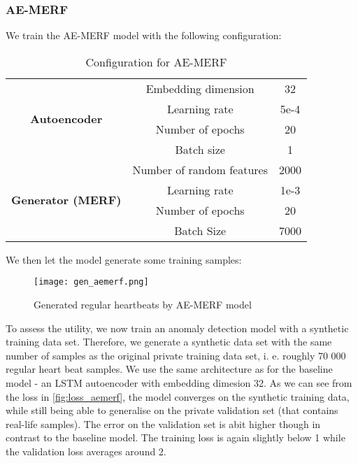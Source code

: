 \subsubsection*{AE-MERF}
We train the AE-MERF model with the following configuration:
\begin{table}[H]
    \centering
    \begin{tabular}{|c|c|c|}
        \hline
        \multirow{4}{*}{\textbf{Autoencoder}}& Embedding dimension & 32 \\ 
                                    & Learning rate & 5e-4 \\
                                    & Number of epochs& 20\\
                                    & Batch size & 1\\
        \hline
        \multirow{4}{*}{\textbf{Generator (MERF)}} & Number of random features & 2000 \\
                                        & Learning rate & 1e-3\\
                                        & Number of epochs & 20\\
                                        & Batch Size & 7000 \\
        \hline
    \end{tabular}
    \caption{Configuration for AE-MERF}
\end{table}
We then let the model generate some training samples: 

\begin{figure}[h]
    \centering
    \texttt{[image: gen\_aemerf.png]}
    \caption{Generated regular heartbeats by AE-MERF model}
\end{figure}

To assess the utility, we now train an anomaly detection model with a synthetic training data set. Therefore, we generate a synthetic data set with the same number of samples as the original private training data set, i. e. roughly 70 000 regular heart beat samples. We use the same architecture as for the baseline model - an LSTM autoencoder with embedding dimesion 32. As we can see from the loss in \cref{fig:loss_aemerf}, the model converges on the synthetic training data, while still being able to generalise on the private validation set (that contains real-life samples). The error on the validation set is abit higher though in contrast to the baseline model. The training loss is again slightly below 1 while the validation loss averages around 2. 

